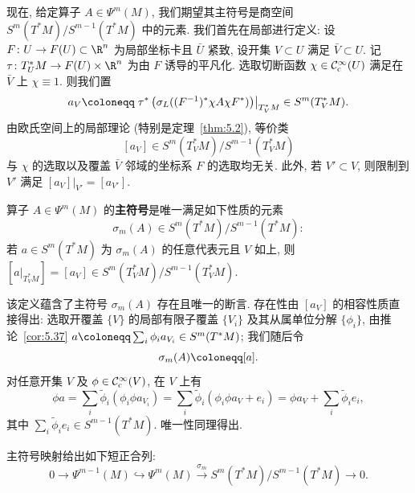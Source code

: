 现在, 给定算子 $A \in \Psi^m(M)$, 我们期望其主符号是商空间 $S^m(T^* M) / S^{m-1}(T^* M)$ 中的元素. 我们首先在局部进行定义: 设 $F \colon U \to F(U) \subset \R^n$ 为局部坐标卡且 $\bar{U}$ 紧致, 设开集 $V \subset U$ 满足 $\bar{V} \subset U$. 记 $\tau \colon T_U^* M \to F(U) \times \R^n$ 为由 $F$ 诱导的平凡化. 选取切断函数 $\chi \in \mathcal{C}_{\mathrm{c}}^\infty(U)$ 满足在 $\bar{V}$ 上 $\chi \equiv 1$. 则我们置
\begin{equation}\label{eq:5.84}
    a_V \defeq \left. \tau^*\left( \sigma_L((F^{-1})^* \chi A \chi F^*) \right) \right|_{T_V^* M} \in S^m(T_V^* M).
\end{equation}
由欧氏空间上的局部理论 (特别是定理~\ref{thm:5.2}), 等价类
\begin{equation}\label{eq:5.85}
    [a_V] \in S^m(T_V^* M) / S^{m-1}(T_V^* M)
\end{equation}
与 $\chi$ 的选取以及覆盖 $\bar{V}$ 邻域的坐标系 $F$ 的选取均无关. 此外, 若 $V' \subset V$, 则限制到 $V'$ 满足 $[a_V]|_{V'} = [a_{V'}]$.

\begin{definition}[流形上伪微分算子的主符号]\label{def:5.38}
算子 $A \in \Psi^m(M)$ 的\textbf{主符号}是唯一满足如下性质的元素
\begin{equation}\label{eq:5.86}
    \sigma_m(A) \in S^m(T^* M) / S^{m-1}(T^* M):
\end{equation}
若 $a \in S^m(T^* M)$ 为 $\sigma_m(A)$ 的任意代表元且 $V$ 如上, 则 $[a|_{T_V^* M}] = [a_V] \in S^m(T_V^* M) / S^{m-1}(T_V^* M)$.
\end{definition}

该定义蕴含了主符号 $\sigma_m(A)$ 存在且唯一的断言. 存在性由 $[a_V]$ 的相容性质直接得出: 选取开覆盖 $\{V\}$ 的局部有限子覆盖 $\{V_i\}$ 及其从属单位分解 $\{\phi_i\}$, 由推论~\ref{cor:5.37} $a \defeq \sum_i \phi_i a_{V_i} \in S^m(T^* M)$; 我们随后令
\begin{equation}\label{eq:5.87}
    \sigma_m(A) \defeq [a].
\end{equation}
对任意开集 $V$ 及 $\phi \in \mathcal{C}_{\mathrm{c}}^\infty(V)$, 在 $V$ 上有
\begin{equation}\label{eq:5.88}
    \phi a = \sum_i \tilde{\phi}_i (\phi_i \phi a_{V_i}) = \sum_i \tilde{\phi}_i (\phi_i \phi a_V + e_i) = \phi a_V + \sum_i \tilde{\phi}_i e_i,
\end{equation}
其中 $\sum_i \tilde{\phi}_i e_i \in S^{m-1}(T^* M)$. 唯一性同理得出.

\begin{proposition}[流形上主符号短正合列]\label{prop:5.39}
主符号映射给出如下短正合列:
\begin{equation}\label{eq:5.89}
    0 \to \Psi^{m-1}(M) \hookrightarrow \Psi^m(M) \xrightarrow{\sigma_m} S^m(T^* M) / S^{m-1}(T^* M) \to 0.
\end{equation}
\end{proposition}

